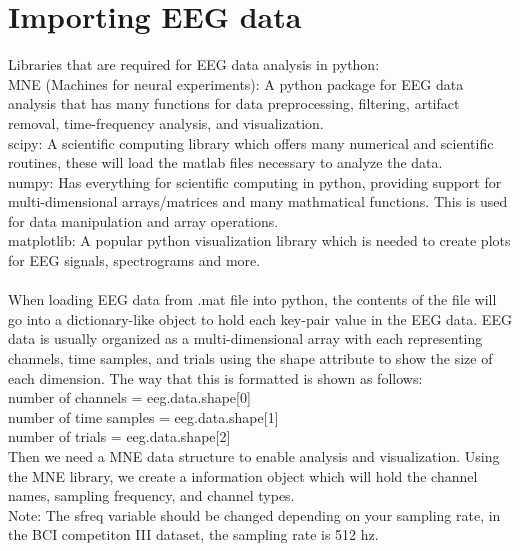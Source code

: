 \documentclass{article}
\begin{document}
\section{Importing EEG data}
Libraries that are required for EEG data analysis in python: \\
MNE (Machines for neural experiments): A python package for EEG data analysis that has many functions for data preprocessing, filtering, artifact removal, time-frequency analysis, and visualization. \\
scipy: A scientific computing library which offers many numerical and scientific routines, these will load the matlab files necessary to analyze the data. \\
numpy: Has everything for scientific computing in python, providing support for multi-dimensional arrays/matrices and many mathmatical functions. This is used for data manipulation and array operations. \\
matplotlib: A popular python visualization library which is needed to create plots for EEG signals, spectrograms and more. \\ \\

When loading EEG data from .mat file into python, the contents of the file will go into a dictionary-like object to hold each key-pair value in the EEG data. EEG data is usually organized as a multi-dimensional array with each representing channels, time samples, and trials using the shape attribute to show the size of each dimension. The way that this is formatted is shown as follows: \\
number of channels = eeg.data.shape[0] \\
number of time samples = eeg.data.shape[1] \\
number of trials = eeg.data.shape[2] \\

Then we need a MNE data structure to enable analysis and visualization. Using the MNE library, we create a information object which will hold the channel names, sampling frequency, and channel types. \\
Note: The sfreq variable should be changed depending on your sampling rate, in the BCI competiton III dataset, the sampling rate is 512 hz. 
\end{document}

